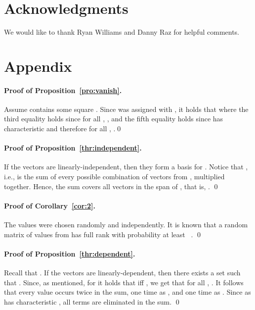 \documentclass{llncs}
\begin{document}
\section{Acknowledgments}
We would like to thank Ryan Williams and Danny Raz for helpful comments.







\section*{Appendix}

\paragraph{Proof of Proposition~\ref{pro:vanish}.}
Assume  contains some square . Since  was assigned with , it holds that  where the third equality holds since for all , , and the fifth equality holds since  has characteristic  and therefore for all , .\qed



\paragraph{Proof of Proposition~\ref{thr:independent}.}
If the  vectors  are linearly-independent, then they form a basis  for . Notice that , i.e.,  is the sum of every possible combination of vectors from , multiplied together. Hence, the sum covers all vectors in the span of , that is, .
\qed

\paragraph{Proof of Corollary~\ref{cor:2}.}
The values  were chosen randomly and independently. It is known that a random  matrix of values from  has full rank with probability at least ~\cite{BK95}.
\qed

\paragraph{Proof of Proposition~\ref{thr:dependent}.}
Recall that . If the  vectors  are linearly-dependent, then there exists a set  such that . Since, as mentioned, for  it holds that  iff , we get that for all , . It follows that every value  occurs twice in the sum, one time as , and one time as . Since  as  has characteristic , all terms are eliminated in the sum.
\qed
\end{document}
